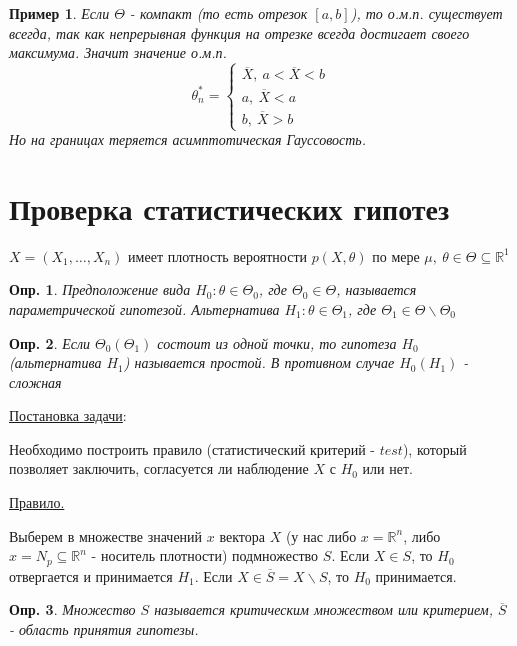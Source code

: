 \documentclass[12pt]{article}
\newtheorem{definition}{Опр.}
\newtheorem*{example}{Пример}
\theoremstyle{basic_theorem}
\theoremstyle{name_theorem}
\def\R{
    \mathbb{R}
}
\begin{document}
\begin{example}
    Если $\Theta$ - компакт (то есть отрезок $[a, b]$), то о.м.п. существует
    всегда, так как непрерывная функция на отрезке всегда достигает своего максимума.
    Значит значение о.м.п.
    \begin{equation*}
        \theta^*_n = \begin{cases}
            \overline{X},\ a < \overline{X} < b \\
            a,\ \overline{X} < a \\
            b,\ \overline{X} > b
        \end{cases}
    \end{equation*}
    Но на границах теряется асимптотическая Гауссовость.
\end{example}


\section{Проверка статистических гипотез}
$X = (X_1, \ldots, X_n)$ имеет плотность вероятности $p(X, \theta)$
по мере $\mu,\ \theta\in\Theta\subseteq\R^1$

\begin{definition}
    Предположение вида $H_0: \theta\in\Theta_0$, где
    $\Theta_0\in\Theta$, называется параметрической гипотезой.
    Альтернатива $H_1:\theta\in\Theta_1$, где
    $\Theta_1\in\Theta\backslash\Theta_0$
\end{definition}

\begin{definition}
    Если $\Theta_0(\Theta_1)$ состоит из одной точки,
    то гипотеза $H_0$ (альтернатива $H_1$) называется
    простой.
    В противном случае $H_0(H_1)$ - сложная
\end{definition}

\underline{Постановка задачи}:

Необходимо построить правило (статистический критерий - $test$),
который позволяет заключить, согласуется ли наблюдение $X$
с $H_0$ или нет.

\underline{Правило.}

Выберем в множестве значений $x$ вектора $X$ (у нас либо
$x = \R^n$, либо $x = N_p \subseteq \R^n$ - носитель
плотности) подмножество $S$. Если $X \in S$, то $H_0$ отвергается и
принимается $H_1$. Если $X \in \overline{S} = X \backslash S$, то
$H_0$ принимается.

\begin{definition}
    Множество $S$ называется критическим множеством или критерием,
    $\overline{S}$ - область принятия гипотезы.
\end{definition}
\end{document}
